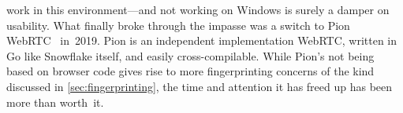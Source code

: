 \documentclass[letterpaper,twocolumn]{article}
\begin{document}
work in this environment---and
not working on Windows is surely a damper on usability.
What finally broke through the impasse was a switch
to Pion WebRTC~\cite{pion-webrtc} in~2019.
Pion is an independent implementation WebRTC,
written in Go like Snowflake itself,
and easily cross-compilable.
While Pion's not being based on browser code
gives rise to more fingerprinting concerns
of the kind discussed in \autoref{sec:fingerprinting},
the time and attention it has freed up
has been more than worth~it.

\end{document}
